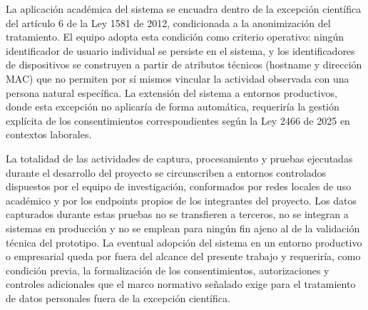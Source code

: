 La aplicación académica del sistema se encuadra dentro de la 
excepción científica del artículo 6 de la Ley 1581 de 2012, 
condicionada a la anonimización del tratamiento. El equipo adopta 
esta condición como criterio operativo: ningún identificador de 
usuario individual se persiste en el sistema, y los identificadores 
de dispositivos se construyen a partir de atributos técnicos 
(hostname y dirección MAC) que no permiten por sí mismos vincular la 
actividad observada con una persona natural específica. La extensión 
del sistema a entornos productivos, donde esta excepción no aplicaría 
de forma automática, requeriría la gestión explícita de los 
consentimientos correspondientes según la Ley 2466 de 2025 en 
contextos laborales.

La totalidad de las actividades de captura, procesamiento y pruebas 
ejecutadas durante el desarrollo del proyecto se circunscriben a 
entornos controlados dispuestos por el equipo de investigación, 
conformados por redes locales de uso académico y por los endpoints 
propios de los integrantes del proyecto. Los datos capturados durante 
estas pruebas no se transfieren a terceros, no se integran a 
sistemas en producción y no se emplean para ningún fin ajeno al de 
la validación técnica del prototipo. La eventual adopción del sistema 
en un entorno productivo o empresarial queda por fuera del alcance 
del presente trabajo y requeriría, como condición previa, la 
formalización de los consentimientos, autorizaciones y controles 
adicionales que el marco normativo señalado exige para el tratamiento 
de datos personales fuera de la excepción científica.